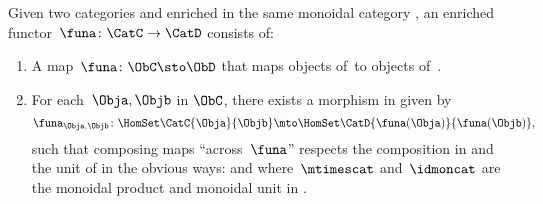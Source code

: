 \begin{ctdefinition}
    \label{def:enrichedfunctor}
    Given two categories \CatC and \CatD enriched in the same monoidal category \CatV, an enriched functor~$\funa\colon \CatC \to \CatD$ consists of:
    \begin{enumerate}
        \item A map~$\funa\colon \ObC \sto \ObD$ that maps objects of~\CatC to objects of~\CatD.
        \item For each~$\Obja, \Objb$ in $\ObC$, there exists a morphism in \CatV given by
              \begin{equation}
                  \funa_{\Obja, \Objb} \colon \HomSet\CatC{\Obja}{\Objb} \mto \HomSet\CatD{\funa(\Obja)}{\funa(\Objb)},
              \end{equation}
              such that composing maps ``across~$\funa$'' respects the composition in \CatC and the unit of \CatV in the obvious ways:
              and
              where~$\mtimescat$ and~$\idmoncat$ are the monoidal product and monoidal unit in \CatV.
    \end{enumerate}
\end{ctdefinition}


